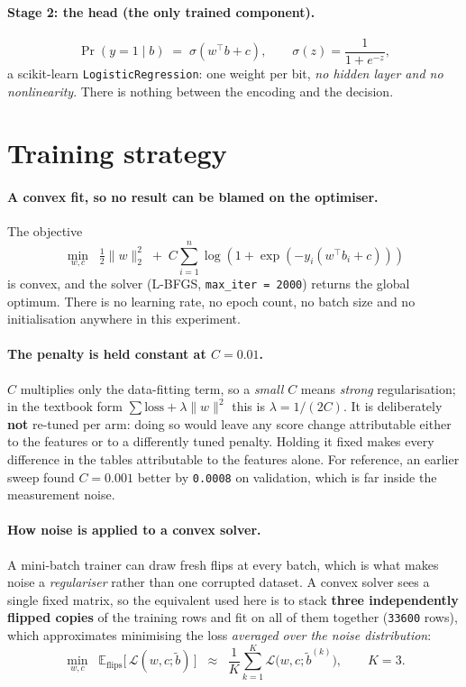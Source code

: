 \documentclass[11pt,a4paper]{article}
\newcommand{\num}[1]{\texttt{#1}}
\begin{document}
\paragraph{Stage 2: the head (the only trained component).}
\[
\Pr(y=1 \mid b) \;=\; \sigma\!\left(w^{\!\top} b + c\right),
\qquad \sigma(z) = \frac{1}{1+e^{-z}},
\]
a scikit-learn \texttt{LogisticRegression}: one weight per bit, \emph{no hidden
layer and no nonlinearity}. There is nothing between the encoding and the
decision.

\section{Training strategy}

\paragraph{A convex fit, so no result can be blamed on the optimiser.}
The objective
\[
\min_{w,c}\;\; \tfrac{1}{2}\lVert w \rVert_2^2
\;+\; C \sum_{i=1}^{n} \log\!\left(1 + \exp\!\left(-y_i (w^{\!\top} b_i + c)\right)\right)
\]
is convex, and the solver (L-BFGS, \num{max\_iter = 2000}) returns the global
optimum. There is no learning rate, no epoch count, no batch size and no
initialisation anywhere in this experiment.

\paragraph{The penalty is held constant at $C = 0.01$.}
$C$ multiplies only the data-fitting term, so a \emph{small} $C$ means
\emph{strong} regularisation; in the textbook form $\sum \text{loss} + \lambda
\lVert w\rVert^2$ this is $\lambda = 1/(2C)$. It is deliberately \textbf{not}
re-tuned per arm: doing so would leave any score change attributable either to
the features or to a differently tuned penalty. Holding it fixed makes every
difference in the tables attributable to the features alone. For reference, an
earlier sweep found $C = 0.001$ better by \num{0.0008} on validation, which is
far inside the measurement noise.

\paragraph{How noise is applied to a convex solver.}
A mini-batch trainer can draw fresh flips at every batch, which is what makes
noise a \emph{regulariser} rather than one corrupted dataset. A convex solver
sees a single fixed matrix, so the equivalent used here is to stack
\textbf{three independently flipped copies} of the training rows and fit on all
of them together (\num{33600} rows), which approximates minimising the loss
\emph{averaged over the noise distribution}:
\[
\min_{w,c}\;\; \mathbb{E}_{\text{flips}}\big[\,\mathcal{L}(w,c;\tilde b)\,\big]
\;\;\approx\;\;
\frac{1}{K}\sum_{k=1}^{K} \mathcal{L}\big(w,c;\tilde b^{(k)}\big), \qquad K = 3 .
\]
\end{document}
